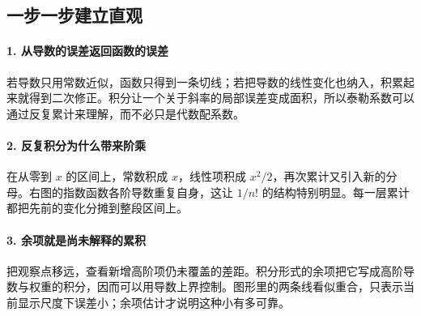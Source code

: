 \subsection*{一步一步建立直观}

\paragraph{1. 从导数的误差返回函数的误差}

若导数只用常数近似，函数只得到一条切线；若把导数的线性变化也纳入，积累起来就得到二次修正。积分让一个关于斜率的局部误差变成面积，所以泰勒系数可以通过反复累计来理解，而不必只是代数配系数。



\paragraph{2. 反复积分为什么带来阶乘}

在从零到 $x$ 的区间上，常数积成 $x$，线性项积成 $x^2/2$，再次累计又引入新的分母。右图的指数函数各阶导数重复自身，这让 $1/n!$ 的结构特别明显。每一层累计都把先前的变化分摊到整段区间上。



\paragraph{3. 余项就是尚未解释的累积}

把观察点移远，查看新增高阶项仍未覆盖的差距。积分形式的余项把它写成高阶导数与权重的积分，因而可以用导数上界控制。图形里的两条线看似重合，只表示当前显示尺度下误差小；余项估计才说明这种小有多可靠。
